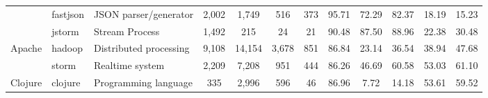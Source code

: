 \begin{landscape}
\begin{table}
\begin{tabular}{lllccccccccc}
                            & fastjson                                                      & JSON parser/generator                                                    & 2,002           & 1,749            & 516                                                              & 373            & 95.71          & 72.29          & 82.37          & 18.19                                                             & 15.23                                                              \\
                            & jstorm                                                        & Stream Process                                                           & 1,492           & 215              & 24                                                               & 21             & 90.48          & 87.50          & 88.96          & 22.38                                                             & 30.48                                                              \\ \hline
\multirow{2}{*}{Apache}     & hadoop                                                        & Distributed processing                                                   & 9,108           & 14,154           & 3,678                                                            & 851            & 86.84          & 23.14          & 36.54          & 38.94                                                             & 47.68                                                              \\
                            & storm                                                         & Realtime system                                                          & 2,209           & 7,208            & 951                                                              & 444            & 86.26          & 46.69          & 60.58          & 53.03                                                             & 61.10                                                              \\ \hline
Clojure                     & clojure                                                       & Programming language                                                     & 335             & 2,996            & 596                                                              & 46             & 86.96          & 7.72           & 14.18          & 53.61                                                             & 59.52                                                              \\ \hline

\end{tabular}
\end{table}
\end{landscape}
